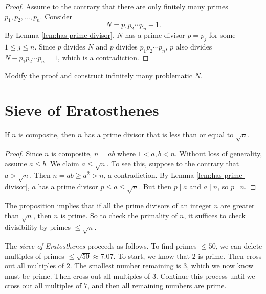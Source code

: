 \begin{proof}
  Assume to the contrary that there are
  only finitely many primes
  $p_1, p_2, \dots, p_n$.
  Consider
  \[
    N = p_1 p_2 \cdots p_n + 1.
  \]
  By Lemma \ref{lem:has-prime-divisor},
  $N$ has a prime divisor $p = p_j$
  for some $1 \le j \le n$. Since
  $p$ divides $N$ and $p$ divides
  $p_1 p_2 \cdots p_n$,
  $p$ also divides
  $N - p_1 p_2 \cdots p_n = 1$,
  which is a contradiction.
\end{proof}

\begin{exercise}
  Modify the proof and construct
  infinitely many problematic $N$.
\end{exercise}

\section{Sieve of Eratosthenes}

\begin{prop}
  If $n$ is composite, then $n$ has a
  prime divisor that is less than or
  equal to $\sqrt{n}$.
\end{prop}

\begin{proof}
  Since $n$ is composite, $n = ab$ where
  $1 < a, b < n$. Without loss of
  generality, assume $a \le b$. We claim
  $a \le \sqrt{n}$. To see this,
  suppose to the contrary that
  $a > \sqrt{n}$.
  Then $n = ab \ge a^2 > n$, a
  contradiction.
  By Lemma
  \ref{lem:has-prime-divisor},
  $a$ has a prime divisor
  $p \le a \le \sqrt{n}$. But then
  $p \mid a$ and $a \mid n$, so $p \mid n$.
\end{proof}

\begin{remark}
  The proposition implies that if
  all the prime divisors of an integer
  $n$ are greater than $\sqrt{n}$,
  then $n$ is prime. So to check the
  primality of $n$,
  it suffices to check divisibility
  by primes $\le \sqrt{n}$.
\end{remark}

\begin{example}
  The \emph{sieve of Eratosthenes} proceeds
  as follows. To find primes $\le 50$,
  we can delete multiples of primes
  $\le \sqrt{50} \approx 7.07$. To start,
  we know that $2$ is prime. Then cross
  out all multiples of $2$. The smallest
  number remaining is $3$, which we now
  know must be prime. Then cross out all
  multiples of $3$. Continue this process
  until we cross out all multiples of
  $7$, and then all remaining numbers
  are prime.
\end{example}

